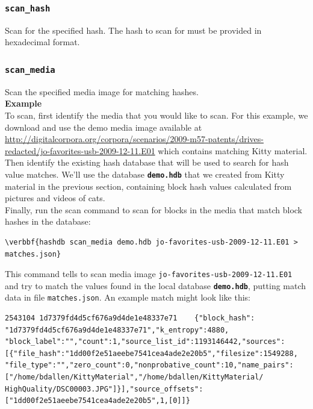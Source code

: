 \documentclass[11pt,fleqn]{article} %
\begin{document}
\subsubsection{\texttt{scan\_hash}}
Scan for the specified hash. The hash to scan for must be provided in hexadecimal format.
\subsubsection{\texttt{scan\_media}}
Scan the specified media image for matching hashes.\\

\textbf{Example}\\
To scan, first identify the media that you would like to scan. For this example, we download and use the demo media image available at \url{ http://digitalcorpora.org/corpora/scenarios/2009-m57-patents/drives-redacted/jo-favorites-usb-2009-12-11.E01} which contains matching Kitty material.\\

Then identify the existing hash database that will be used to search for hash value matches. We'll use the database \texttt{\textbf{demo.hdb}} that we created from Kitty material in the previous section, containing block hash values calculated from pictures and videos of cats.\\

Finally, run the \hdb scan command to scan for blocks in the media that match block hashes in the database:
\begin{Verbatim}[commandchars=\\\{\}]
\verbbf{hashdb scan_media demo.hdb jo-favorites-usb-2009-12-11.E01 > matches.json}
\end{Verbatim}
This command tells \hdb to scan media image \verb+jo-favorites-usb-2009-12-11.E01+ and try to match the values found in the local database \texttt{\textbf{demo.hdb}}, putting match data in file \verb+matches.json+.  An example match might look like this:

\begingroup
\footnotesize
\begin{Verbatim}[fontfamily=courier]
2543104	1d7379fd4d5cf676a9d4de1e48337e71	{"block_hash":
"1d7379fd4d5cf676a9d4de1e48337e71","k_entropy":4880,
"block_label":"","count":1,"source_list_id":1193146442,"sources":
[{"file_hash":"1dd00f2e51aeebe7541cea4ade2e20b5","filesize":1549288,
"file_type":"","zero_count":0,"nonprobative_count":10,"name_pairs":
["/home/bdallen/KittyMaterial","/home/bdallen/KittyMaterial/
HighQuality/DSC00003.JPG"]}],"source_offsets":
["1dd00f2e51aeebe7541cea4ade2e20b5",1,[0]]}
\end{Verbatim}
\endgroup
\end{document}
